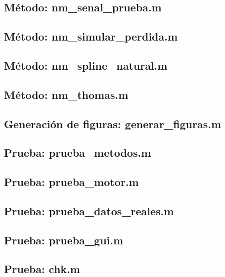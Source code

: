 \subsection*{Método: nm\_senal\_prueba.m}


\subsection*{Método: nm\_simular\_perdida.m}


\subsection*{Método: nm\_spline\_natural.m}


\subsection*{Método: nm\_thomas.m}


\subsection*{Generación de figuras: generar\_figuras.m}


\subsection*{Prueba: prueba\_metodos.m}


\subsection*{Prueba: prueba\_motor.m}


\subsection*{Prueba: prueba\_datos\_reales.m}


\subsection*{Prueba: prueba\_gui.m}


\subsection*{Prueba: chk.m}

